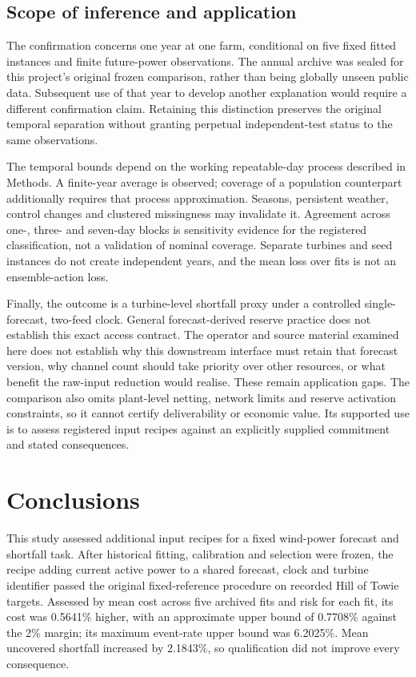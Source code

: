 \documentclass[
  british,
  11pt,
]{article}
\begin{document}
\subsection{Scope of inference and
application}\label{scope-of-inference-and-application}

The confirmation concerns one year at one farm, conditional on five
fixed fitted instances and finite future-power observations. The annual
archive was sealed for this project's original frozen comparison, rather
than being globally unseen public data. Subsequent use of that year to
develop another explanation would require a different confirmation
claim. Retaining this distinction preserves the original temporal
separation without granting perpetual independent-test status to the
same observations.

The temporal bounds depend on the working repeatable-day process
described in Methods. A finite-year average is observed; coverage of a
population counterpart additionally requires that process approximation.
Seasons, persistent weather, control changes and clustered missingness
may invalidate it. Agreement across one-, three- and seven-day blocks is
sensitivity evidence for the registered classification, not a validation
of nominal coverage. Separate turbines and seed instances do not create
independent years, and the mean loss over fits is not an ensemble-action
loss.

Finally, the outcome is a turbine-level shortfall proxy under a
controlled single-forecast, two-feed clock. General forecast-derived
reserve practice does not establish this exact access contract. The
operator and source material examined here does not establish why this
downstream interface must retain that forecast version, why channel
count should take priority over other resources, or what benefit the
raw-input reduction would realise. These remain application gaps. The
comparison also omits plant-level netting, network limits and reserve
activation constraints, so it cannot certify deliverability or economic
value. Its supported use is to assess registered input recipes against
an explicitly supplied commitment and stated consequences.

\section{Conclusions}\label{conclusions}

This study assessed additional input recipes for a fixed wind-power
forecast and shortfall task. After historical fitting, calibration and
selection were frozen, the recipe adding current active power to a
shared forecast, clock and turbine identifier passed the original
fixed-reference procedure on recorded Hill of Towie targets. Assessed by
mean cost across five archived fits and risk for each fit, its cost was
0.5641\% higher, with an approximate upper bound of 0.7708\% against the
2\% margin; its maximum event-rate upper bound was 6.2025\%. Mean
uncovered shortfall increased by 2.1843\%, so qualification did not
improve every consequence.
\end{document}
